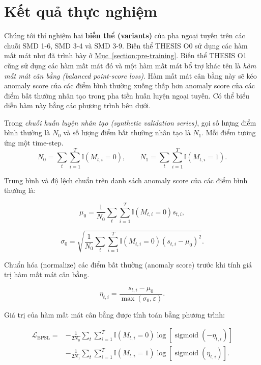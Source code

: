 \pagebreak
\section{Kết quả thực nghiệm}

Chúng tôi thí nghiệm hai \textbf{biến thể (variants)} của pha ngoại tuyến trên các chuỗi SMD 1-6, SMD 3-4 và SMD 3-9. Biến thể THESIS O0 sử dụng các hàm mất mát như đã trình bày ở \hyperref[section:pre-training]{Mục~\ref*{section:pre-training}}. Biến thể THESIS O1 cũng sử dụng các hàm mất mát đó và một hàm mất mát bổ trợ khác tên là \textit{hàm mất mát cân bằng (balanced point-score loss)}. Hàm mất mát cân bằng này sẽ kéo anomaly score của các điểm bình thường xuống thấp hơn anomaly score của các điểm bất thường nhân tạo trong pha tiền huấn luyện ngoại tuyến. Có thể biểu diễn hàm này bằng các phương trình bên dưới.

Trong \textit{chuỗi huấn luyện nhân tạo (synthetic validation series)}, gọi số lượng điểm bình thường là $N_0$ và số lượng điểm bất thường nhân tạo là $N_1$. Mỗi điểm tương ứng một time-step.
\begin{equation}
N_0
=
\sum_{t}\sum_{i=1}^{T}
\mathbb{I}\left(M_{t,i}=0\right),
\qquad
N_1
=
\sum_{t}\sum_{i=1}^{T}
\mathbb{I}\left(M_{t,i}=1\right).
\end{equation}

Trung bình và độ lệch chuẩn trên danh sách anomaly score của các điểm bình thường là:

\begin{equation}
\mu_0
=
\frac{1}{N_0}
\sum_{t}\sum_{i=1}^{T}
\mathbb{I}\left(M_{t,i}=0\right)s_{t,i},
\end{equation}

\begin{equation}
\sigma_0
=
\sqrt{
\frac{1}{N_0}
\sum_{t}\sum_{i=1}^{T}
\mathbb{I}\left(M_{t,i}=0\right)
\left(s_{t,i}-\mu_0\right)^2
}.
\end{equation}

Chuẩn hóa (normalize) các điểm bất thường (anomaly score) trước khi tính giá trị hàm mất mát cân bằng.

\begin{equation}
\eta_{t,i}
=
\frac{s_{t,i}-\mu_0}
{\max\left(\sigma_0,\varepsilon\right)}.
\end{equation}

Giá trị của hàm mất mát cân bằng được tính toán bằng phương trình:

\begin{equation}
\boxed{
\begin{aligned}
\mathcal{L}_{\mathrm{BPSL}}
=
&-\frac{1}{2N_0}
\sum_{t}\sum_{i=1}^{T}
\mathbb{I}\left(M_{t,i}=0\right)
\log\left[
\operatorname{sigmoid}\left(-\eta_{t,i}\right)
\right]
\\
&-\frac{1}{2N_1}
\sum_{t}\sum_{i=1}^{T}
\mathbb{I}\left(M_{t,i}=1\right)
\log\left[
\operatorname{sigmoid}\left(\eta_{t,i}\right)
\right].
\end{aligned}
}
\end{equation}

